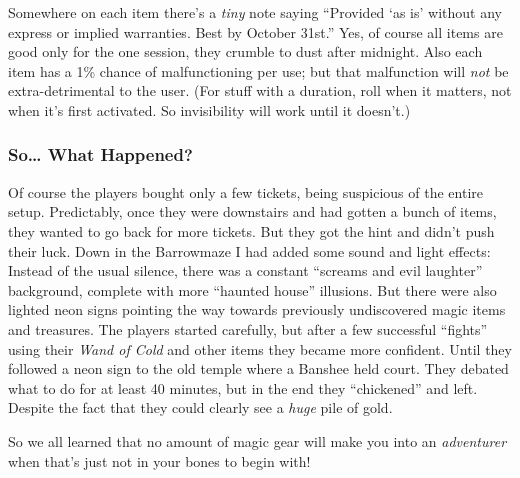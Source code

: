 Somewhere on each item there's a \emph{tiny} note saying ``Provided `as is'
without any express or implied warranties. Best by October 31st.'' Yes, of
course all items are good only for the one session, they crumble to dust after
midnight. Also each item has a 1\% chance of malfunctioning per use; but that
malfunction will \emph{not} be extra-detrimental to the user. (For stuff with
a duration, roll when it matters, not when it's first activated. So invisibility
will work until it doesn't.)

\subsubsection{So\dots{} What Happened?}

Of course the players bought only a few tickets, being suspicious of the entire
setup. Predictably, once they were downstairs and had gotten a bunch of items,
they wanted to go back for more tickets. But they got the hint and didn't push
their luck.
%
Down in the Barrowmaze I had added some sound and light effects: Instead of the
usual silence, there was a constant ``screams and evil laughter'' background,
complete with more ``haunted house'' illusions. But there were also lighted
neon signs pointing the way towards previously undiscovered magic items and
treasures.
%
The players started carefully, but after a few successful ``fights'' using
their \emph{Wand of Cold} and other items they became more confident. Until
they followed a neon sign to the old temple where a Banshee held court. They
debated what to do for at least 40 minutes, but in the end they ``chickened''
and left. Despite the fact that they could clearly see a \emph{huge} pile of
gold.

So we all learned that no amount of magic gear will make you into an
\emph{adventurer} when that's just not in your bones to begin with!
\endinput
